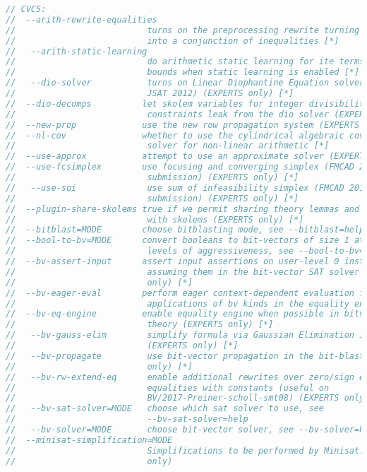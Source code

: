 \begin{lstlisting}[language=rust, caption={structs/benchmark.rs}]
// CVC5:
//  --arith-rewrite-equalities
//                          turns on the preprocessing rewrite turning equalities
//                          into a conjunction of inequalities [*]
//   --arith-static-learning
//                          do arithmetic static learning for ite terms based on
//                          bounds when static learning is enabled [*]
//   --dio-solver           turns on Linear Diophantine Equation solver (Griggio,
//                          JSAT 2012) (EXPERTS only) [*]
//  --dio-decomps          let skolem variables for integer divisibility
//                          constraints leak from the dio solver (EXPERTS only) [*]
//  --new-prop             use the new row propagation system (EXPERTS only) [*]
//  --nl-cov               whether to use the cylindrical algebraic coverings
//                          solver for non-linear arithmetic [*]
//  --use-approx           attempt to use an approximate solver (EXPERTS only) [*]
//  --use-fcsimplex        use focusing and converging simplex (FMCAD 2013
//                          submission) (EXPERTS only) [*]
//   --use-soi              use sum of infeasibility simplex (FMCAD 2013
//                          submission) (EXPERTS only) [*]
//  --plugin-share-skolems true if we permit sharing theory lemmas and SAT clauses
//                          with skolems (EXPERTS only) [*]
//  --bitblast=MODE        choose bitblasting mode, see --bitblast=help
//  --bool-to-bv=MODE      convert booleans to bit-vectors of size 1 at various
//                          levels of aggressiveness, see --bool-to-bv=help
//  --bv-assert-input      assert input assertions on user-level 0 instead of
//                          assuming them in the bit-vector SAT solver (EXPERTS
//                          only) [*]
//  --bv-eager-eval        perform eager context-dependent evaluation for
//                          applications of bv kinds in the equality engine [*]
//  --bv-eq-engine         enable equality engine when possible in bitvector
//                          theory (EXPERTS only) [*]
//   --bv-gauss-elim        simplify formula via Gaussian Elimination if applicable
//                          (EXPERTS only) [*]
//   --bv-propagate         use bit-vector propagation in the bit-blaster (EXPERTS
//                          only) [*]
//   --bv-rw-extend-eq      enable additional rewrites over zero/sign extend over
//                          equalities with constants (useful on
//                          BV/2017-Preiner-scholl-smt08) (EXPERTS only) [*]
//   --bv-sat-solver=MODE   choose which sat solver to use, see
//                          --bv-sat-solver=help
//   --bv-solver=MODE       choose bit-vector solver, see --bv-solver=help
//  --minisat-simplification=MODE
//                          Simplifications to be performed by Minisat. (EXPERTS
//                          only)


\end{lstlisting}
